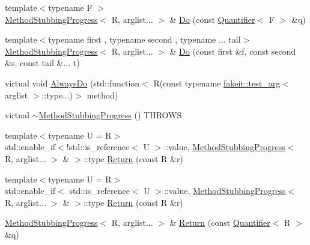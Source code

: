 \begin{DoxyCompactItemize}
\item 
{\footnotesize template$<$typename F $>$ }\\\mbox{\hyperlink{structfakeit_1_1MethodStubbingProgress}{Method\+Stubbing\+Progress}}$<$ R, arglist... $>$ \& \mbox{\hyperlink{structfakeit_1_1MethodStubbingProgress_a59f9d7ab7c86b809ce25b41d05b58ad2}{Do}} (const \mbox{\hyperlink{structfakeit_1_1Quantifier}{Quantifier}}$<$ F $>$ \&q)
\item 
{\footnotesize template$<$typename first , typename second , typename ... tail$>$ }\\\mbox{\hyperlink{structfakeit_1_1MethodStubbingProgress}{Method\+Stubbing\+Progress}}$<$ R, arglist... $>$ \& \mbox{\hyperlink{structfakeit_1_1MethodStubbingProgress_a157561400e37da65c5b48f4466fc603c}{Do}} (const first \&f, const second \&s, const tail \&... t)
\item 
virtual void \mbox{\hyperlink{structfakeit_1_1MethodStubbingProgress_a47464ab35cb06c00dbd00a13328b80a7}{Always\+Do}} (std\+::function$<$ R(const typename \mbox{\hyperlink{structfakeit_1_1test__arg}{fakeit\+::test\+\_\+arg}}$<$ arglist $>$\+::type...)$>$ method)
\item 
virtual \mbox{\hyperlink{structfakeit_1_1MethodStubbingProgress_aed2c96ce537706935976943354c49616}{$\sim$\+Method\+Stubbing\+Progress}} () T\+H\+R\+O\+WS
\item 
{\footnotesize template$<$typename U  = R$>$ }\\std\+::enable\+\_\+if$<$!std\+::is\+\_\+reference$<$ U $>$\+::value, \mbox{\hyperlink{structfakeit_1_1MethodStubbingProgress}{Method\+Stubbing\+Progress}}$<$ R, arglist... $>$ \& $>$\+::type \mbox{\hyperlink{structfakeit_1_1MethodStubbingProgress_ab97be63c322887db40cb788d28875fea}{Return}} (const R \&r)
\item 
{\footnotesize template$<$typename U  = R$>$ }\\std\+::enable\+\_\+if$<$ std\+::is\+\_\+reference$<$ U $>$\+::value, \mbox{\hyperlink{structfakeit_1_1MethodStubbingProgress}{Method\+Stubbing\+Progress}}$<$ R, arglist... $>$ \& $>$\+::type \mbox{\hyperlink{structfakeit_1_1MethodStubbingProgress_ab20141c6f552c3aa3399660c520c2ba4}{Return}} (const R \&r)
\item 
\mbox{\hyperlink{structfakeit_1_1MethodStubbingProgress}{Method\+Stubbing\+Progress}}$<$ R, arglist... $>$ \& \mbox{\hyperlink{structfakeit_1_1MethodStubbingProgress_acb4d4db8208a8eaadff77e7cbf3775db}{Return}} (const \mbox{\hyperlink{structfakeit_1_1Quantifier}{Quantifier}}$<$ R $>$ \&q)
\item 

\end{DoxyCompactItemize}
